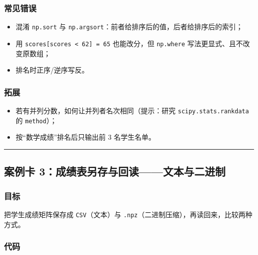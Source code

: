 \subsubsection{常见错误}\label{ux5e38ux89c1ux9519ux8bef-4}

\begin{itemize}
\tightlist
\item
  混淆 \texttt{np.sort} 与
  \texttt{np.argsort}：前者给排序后的值，后者给排序后的索引；
\item
  用 \texttt{scores{[}scores\ \textless{}\ 62{]}\ =\ 65} 也能改分，但
  \texttt{np.where} 写法更显式、且不改变原数组；
\item
  排名时正序/逆序写反。
\end{itemize}

\subsubsection{拓展}\label{ux62d3ux5c55-4}

\begin{itemize}
\tightlist
\item
  若有并列分数，如何让并列者名次相同（提示：研究
  \texttt{scipy.stats.rankdata} 的 \texttt{method}）；
\item
  按``数学成绩''排名后只输出前 3 名学生名单。
\end{itemize}

\begin{center}\rule{0.5\linewidth}{0.5pt}\end{center}

\subsection{案例卡
3：成绩表另存与回读------文本与二进制}\label{ux6848ux4f8bux5361-3ux6210ux7ee9ux8868ux53e6ux5b58ux4e0eux56deux8bfbux6587ux672cux4e0eux4e8cux8fdbux5236}

\subsubsection{目标}\label{ux76eeux6807-5}

把学生成绩矩阵保存成 \texttt{CSV}（文本）与
\texttt{.npz}（二进制压缩），再读回来，比较两种方式。

\subsubsection{代码}\label{ux4ee3ux7801-5}


